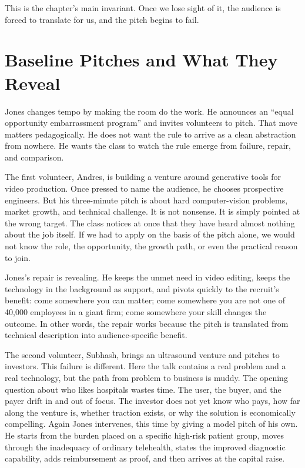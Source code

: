 This is the chapter's main invariant. Once we lose sight of it, the audience is forced to translate for us, and the pitch begins to fail.

\section{Baseline Pitches and What They Reveal}

Jones changes tempo by making the room do the work. He announces an ``equal opportunity embarrassment program'' and invites volunteers to pitch. That move matters pedagogically. He does not want the rule to arrive as a clean abstraction from nowhere. He wants the class to watch the rule emerge from failure, repair, and comparison.

The first volunteer, Andres, is building a venture around generative tools for video production. Once pressed to name the audience, he chooses prospective engineers. But his three-minute pitch is about hard computer-vision problems, market growth, and technical challenge. It is not nonsense. It is simply pointed at the wrong target. The class notices at once that they have heard almost nothing about the job itself. If we had to apply on the basis of the pitch alone, we would not know the role, the opportunity, the growth path, or even the practical reason to join.

Jones's repair is revealing. He keeps the unmet need in video editing, keeps the technology in the background as support, and pivots quickly to the recruit's benefit: come somewhere you can matter; come somewhere you are not one of 40,000 employees in a giant firm; come somewhere your skill changes the outcome. In other words, the repair works because the pitch is translated from technical description into audience-specific benefit.

The second volunteer, Subhash, brings an ultrasound venture and pitches to investors. This failure is different. Here the talk contains a real problem and a real technology, but the path from problem to business is muddy. The opening question about who likes hospitals wastes time. The user, the buyer, and the payer drift in and out of focus. The investor does not yet know who pays, how far along the venture is, whether traction exists, or why the solution is economically compelling. Again Jones intervenes, this time by giving a model pitch of his own. He starts from the burden placed on a specific high-risk patient group, moves through the inadequacy of ordinary telehealth, states the improved diagnostic capability, adds reimbursement as proof, and then arrives at the capital raise.

